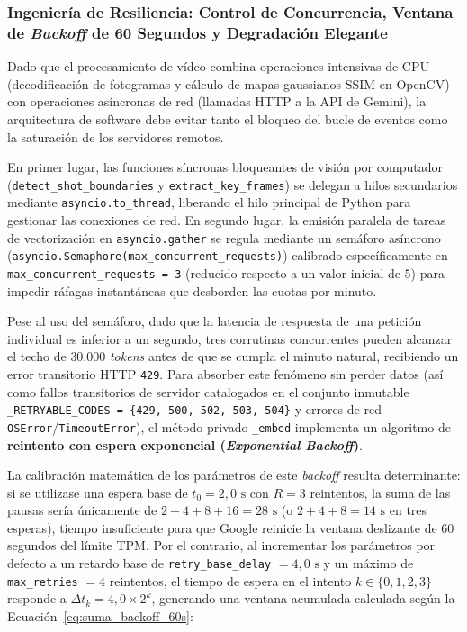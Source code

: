\subsubsection{Ingeniería de Resiliencia: Control de Concurrencia, Ventana de \textit{Backoff} de 60 Segundos y Degradación Elegante}
\label{subsubsec:resiliencia_backoff_degradacion}

Dado que el procesamiento de vídeo combina operaciones intensivas de CPU (decodificación de fotogramas y cálculo de mapas gaussianos SSIM en OpenCV) con operaciones asíncronas de red (llamadas HTTP a la API de Gemini), la arquitectura de software debe evitar tanto el bloqueo del bucle de eventos como la saturación de los servidores remotos. %

En primer lugar, las funciones síncronas bloqueantes de visión por computador (\texttt{detect\_shot\_boundaries} y \texttt{extract\_key\_frames}) se delegan a hilos secundarios mediante \texttt{asyncio.to\_thread}, liberando el hilo principal de Python para gestionar las conexiones de red. %
En segundo lugar, la emisión paralela de tareas de vectorización en \texttt{asyncio.gather} se regula mediante un semáforo asíncrono (\texttt{asyncio.Semaphore(max\_concurrent\_requests)}) calibrado específicamente en \texttt{max\_concurrent\_requests = 3} (reducido respecto a un valor inicial de $5$) para impedir ráfagas instantáneas que desborden las cuotas por minuto. %

Pese al uso del semáforo, dado que la latencia de respuesta de una petición individual es inferior a un segundo, tres corrutinas concurrentes pueden alcanzar el techo de $30.000$ \textit{tokens} antes de que se cumpla el minuto natural, recibiendo un error transitorio HTTP \texttt{429}. %
Para absorber este fenómeno sin perder datos (así como fallos transitorios de servidor catalogados en el conjunto inmutable \texttt{\_RETRYABLE\_CODES = \{429, 500, 502, 503, 504\}} y errores de red \texttt{OSError}/\texttt{TimeoutError}), el método privado \texttt{\_embed} implementa un algoritmo de \textbf{reintento con espera exponencial (\textit{Exponential Backoff})}. %

La calibración matemática de los parámetros de este \textit{backoff} resulta determinante: si se utilizase una espera base de $t_0 = 2,0\text{ s}$ con $R = 3$ reintentos, la suma de las pausas sería únicamente de $2 + 4 + 8 + 16 = 28\text{ s}$ (o $2+4+8 = 14\text{ s}$ en tres esperas), tiempo insuficiente para que Google reinicie la ventana deslizante de $60$ segundos del límite TPM. %
Por el contrario, al incrementar los parámetros por defecto a un retardo base de \texttt{retry\_base\_delay} $= 4,0\text{ s}$ y un máximo de \texttt{max\_retries} $= 4$ reintentos, el tiempo de espera en el intento $k \in \{0, 1, 2, 3\}$ responde a $\Delta t_k = 4,0 \times 2^k$, generando una ventana acumulada calculada según la Ecuación~\eqref{eq:suma_backoff_60s}: %

